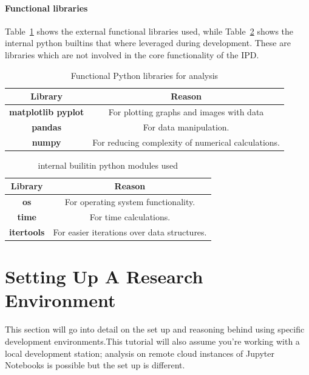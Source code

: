 \paragraph{Functional libraries}
Table~\ref{table:functionalLibrares} shows the external functional libraries used, while Table~\ref{table:builtinmodules} shows the internal python builtins that where leveraged during development.
These are libraries which are not involved in the core functionality of the IPD\@.
\begin{table}[ht]
    \centering
    \begin{tabular}{cc}
        \toprule
        Library & Reason\\
        \midrule
        \textbf{matplotlib pyplot} & For plotting graphs and images with data\\
        \textbf{pandas} & For data manipulation.\\
        \textbf{numpy} & For reducing complexity of numerical calculations.\\
        \bottomrule
    \end{tabular}
    \caption{Functional Python libraries for analysis}\label{table:functionalLibrares}
\end{table}
\begin{table}[ht]
    \centering
    \begin{tabular}{cc}
        \toprule
        Library & Reason\\
        \midrule
        \textbf{os} & For operating system functionality.\\
        \textbf{time} & For time calculations.\\
        \textbf{itertools} & For easier iterations over data structures.\\
        \bottomrule
    \end{tabular}
    \caption{internal builitin python modules used}\label{table:builtinmodules}
\end{table}

\section{Setting Up A Research Environment}\label{subsec:settingUpAResearchEnvironment}
This section will go into detail on the set up and reasoning behind using specific development environments.This tutorial will also assume you're working with a local development station;
analysis on remote cloud instances of Jupyter Notebooks is possible but the set up is different.

